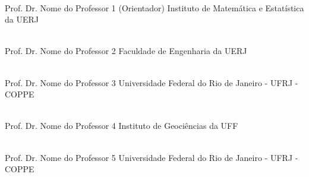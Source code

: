 \begin{flushright}
\parbox{12cm}{

\singlespacing

\hrulefill \\

\vspace{-.4cm}
Prof. Dr. Nome do Professor 1 (Orientador)
\newline
Instituto de Matemática e Estatística da UERJ
\vspace{.7cm}

\hrulefill \\

\vspace{-.4cm}
Prof. Dr. Nome do Professor 2
\newline
Faculdade de Engenharia da UERJ
\vspace{.7cm}

\hrulefill \\

\vspace{-.4cm}
Prof. Dr. Nome do Professor 3
\newline
Universidade Federal do Rio de Janeiro - UFRJ - COPPE
\vspace{.7cm}

\hrulefill \\

\vspace{-.4cm}
Prof. Dr. Nome do Professor 4
\newline
Instituto de Geociências da UFF
\vspace{.7cm}

\hrulefill \\

\vspace{-.4cm}
Prof. Dr. Nome do Professor 5
\newline
Universidade Federal do Rio de Janeiro - UFRJ - COPPE
\vspace{.7cm}

}
\end{flushright}
\vfill

\begin{center}
\setLocationDate
\end{center}
